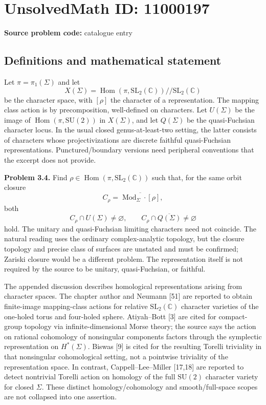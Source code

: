 \documentclass[11pt]{article}
\newcommand{\C}{\mathbb{C}}
\begin{document}
\section*{UnsolvedMath ID: 11000197}
\textbf{Source problem code:} catalogue entry
\subsection{Definitions and mathematical statement}
Let $\pi=\pi_1(\Sigma)$ and let
\[
 X(\Sigma)=\operatorname{Hom}(\pi,\mathrm{SL}_2(\C))//\mathrm{SL}_2(\C)
\]
be the character space, with $[\rho]$ the character of a representation. The mapping class action is by precomposition, well-defined on characters. Let $U(\Sigma)$ be the image of $\operatorname{Hom}(\pi,\mathrm{SU}(2))$ in $X(\Sigma)$, and let $Q(\Sigma)$ be the quasi-Fuchsian character locus. In the usual closed genus-at-least-two setting, the latter consists of characters whose projectivizations are discrete faithful quasi-Fuchsian representations. Punctured/boundary versions need peripheral conventions that the excerpt does not provide.

\textbf{Problem 3.4.} Find $\rho\in\operatorname{Hom}(\pi,\mathrm{SL}_2(\C))$ such that, for the same orbit closure
\[
 C_\rho=\overline{\operatorname{Mod}_{\Sigma}\cdot[\rho]},
\]
both
\[
 C_\rho\cap U(\Sigma)\ne\varnothing,
 \qquad C_\rho\cap\overline{Q(\Sigma)}\ne\varnothing
\]
hold. The unitary and quasi-Fuchsian limiting characters need not coincide. The natural reading uses the ordinary complex-analytic topology, but the closure topology and precise class of surfaces are unstated and must be confirmed; Zariski closure would be a different problem. The representation itself is not required by the source to be unitary, quasi-Fuchsian, or faithful.

The appended discussion describes homological representations arising from character spaces. The chapter author and Neumann [51] are reported to obtain finite-image mapping-class actions for relative $\mathrm{SL}_2(\C)$ character varieties of the one-holed torus and four-holed sphere. Atiyah--Bott [3] are cited for compact-group topology via infinite-dimensional Morse theory; the source says the action on rational cohomology of nonsingular components factors through the symplectic representation on $H^*(\Sigma)$. Biswas [9] is cited for the resulting Torelli triviality in that nonsingular cohomological setting, not a pointwise triviality of the representation space. In contrast, Cappell--Lee--Miller [17,18] are reported to detect nontrivial Torelli action on homology of the full $\mathrm{SU}(2)$ character variety for closed $\Sigma$. These distinct homology/cohomology and smooth/full-space scopes are not collapsed into one assertion.
\end{document}
